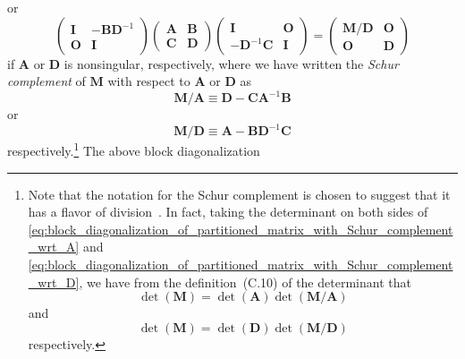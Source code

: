 \documentclass[12pt,a4paper]{article}
\begin{document}
or
\begin{equation}
\begin{pmatrix}
\mathbf{I} & -\mathbf{B}\mathbf{D}^{-1} \\
\mathbf{O} & \mathbf{I}
\end{pmatrix}
\begin{pmatrix}
\mathbf{A} & \mathbf{B} \\
\mathbf{C} & \mathbf{D}
\end{pmatrix}
\begin{pmatrix}
\mathbf{I} & \mathbf{O} \\
-\mathbf{D}^{-1}\mathbf{C} & \mathbf{I}
\end{pmatrix}
=
\begin{pmatrix}
\mathbf{M}/\mathbf{D} & \mathbf{O} \\
\mathbf{O} & \mathbf{D}
\end{pmatrix}
\label{eq:block_diagonalization_of_partitioned_matrix_with_Schur_complement_wrt_D}
\end{equation}
if $\mathbf{A}$ or $\mathbf{D}$ is nonsingular, respectively,
where we have written the \emph{Schur complement} of $\mathbf{M}$ with respect to
$\mathbf{A}$ or $\mathbf{D}$ as
\begin{equation}
\mathbf{M}/\mathbf{A} \equiv \mathbf{D} - \mathbf{C}\mathbf{A}^{-1}\mathbf{B}
\label{eq:Schur_complement_of_M_wrt_A}
\end{equation}
or
\begin{equation}
\mathbf{M}/\mathbf{D} \equiv \mathbf{A} - \mathbf{B}\mathbf{D}^{-1}\mathbf{C}
\label{eq:Schur_complement_of_M_wrt_D}
\end{equation}
respectively.\footnote{%
Note that the notation for the Schur complement is chosen to suggest that
it has a flavor of division~\citep{Minka:OldNewMatrixAlgebra}.
In fact, taking the determinant on both sides of
\eqref{eq:block_diagonalization_of_partitioned_matrix_with_Schur_complement_wrt_A} and
\eqref{eq:block_diagonalization_of_partitioned_matrix_with_Schur_complement_wrt_D},
we have from the definition~(C.10) of the determinant that
\begin{equation}
\operatorname{det}(\mathbf{M}) =
\operatorname{det}(\mathbf{A}) \operatorname{det}(\mathbf{M}/\mathbf{A})
\end{equation}
and
\begin{equation}
\operatorname{det}(\mathbf{M}) =
\operatorname{det}(\mathbf{D}) \operatorname{det}(\mathbf{M}/\mathbf{D})
\end{equation}
respectively.}
The above block diagonalization
\end{document}
